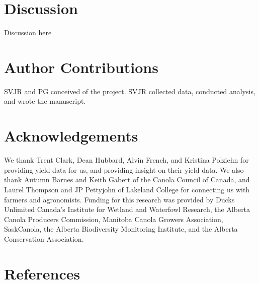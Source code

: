 \documentclass[]{elsarticle} %
\begin{document}
\hypertarget{discussion}{%
\section{Discussion}\label{discussion}}

Discussion here

\hypertarget{author-contributions}{%
\section{Author Contributions}\label{author-contributions}}

SVJR and PG conceived of the project.
SVJR collected data, conducted analysis, and wrote the manuscript.

\hypertarget{acknowledgements}{%
\section{Acknowledgements}\label{acknowledgements}}

We thank Trent Clark, Dean Hubbard, Alvin French, and Kristina Polziehn for providing yield data for us, and providing insight on their yield data.
We also thank Autumn Barnes and Keith Gabert of the Canola Council of Canada, and Laurel Thompson and JP Pettyjohn of Lakeland College for connecting us with farmers and agronomists.
Funding for this research was provided by Ducks Unlimited Canada's Institute for Wetland and Waterfowl Research, the Alberta Canola Producers Commission, Manitoba Canola Growers Association, SaskCanola, the Alberta Biodiversity Monitoring Institute, and the Alberta Conservation Association.

\hypertarget{references}{%
\section*{References}\label{references}}
\end{document}
